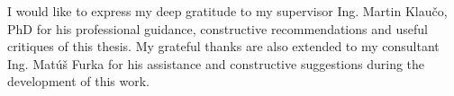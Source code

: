 I would like to express my deep gratitude to my supervisor Ing. Martin Klaučo, PhD for his professional guidance, constructive recommendations and useful critiques of this thesis. My grateful thanks are also extended to my consultant Ing. Matúš Furka for his assistance and constructive suggestions during the development of this work. 
